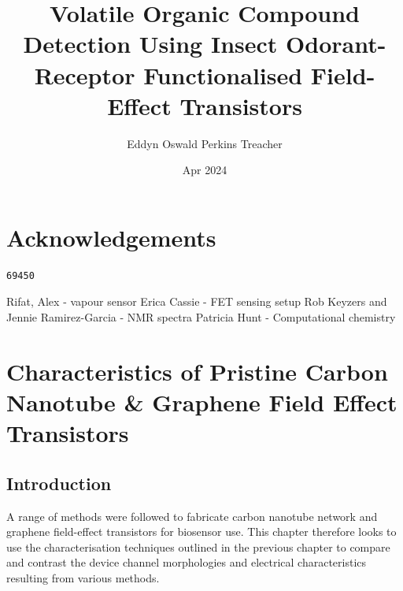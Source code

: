\documentclass[
  a4paper,
]{scrbook}
\title{Volatile Organic Compound Detection Using Insect Odorant-Receptor
Functionalised Field-Effect Transistors}
\author{Eddyn Oswald Perkins Treacher}
\date{Apr 2024}
\renewcommand*\contentsname{Table of contents}
\newcommand\contentsname{Table of contents}
\begin{document}
\frontmatter
\maketitle
\ifdefined\Shaded\renewenvironment{Shaded}{\begin{tcolorbox}[borderline west={3pt}{0pt}{shadecolor}, enhanced, interior hidden, sharp corners, breakable, frame hidden, boxrule=0pt]}{\end{tcolorbox}}\fi

\renewcommand*\contentsname{Table of contents}
{
\setcounter{tocdepth}{2}
\tableofcontents
}
\mainmatter
{}

\hypertarget{acknowledgements}{%
\chapter*{Acknowledgements}\label{acknowledgements}}


\begin{verbatim}
69450
\end{verbatim}

Rifat, Alex - vapour sensor Erica Cassie - FET sensing setup Rob Keyzers
and Jennie Ramirez-Garcia - NMR spectra Patricia Hunt - Computational
chemistry


\hypertarget{sec-pristine-characteristics}{%
\chapter{Characteristics of Pristine Carbon Nanotube \& Graphene Field
Effect Transistors}\label{sec-pristine-characteristics}}

\hypertarget{introduction}{%
\section{Introduction}\label{introduction}}

A range of methods were followed to fabricate carbon nanotube network
and graphene field-effect transistors for biosensor use. This chapter
therefore looks to use the characterisation techniques outlined in the
previous chapter to compare and contrast the device channel morphologies
and electrical characteristics resulting from various methods.
\end{document}
